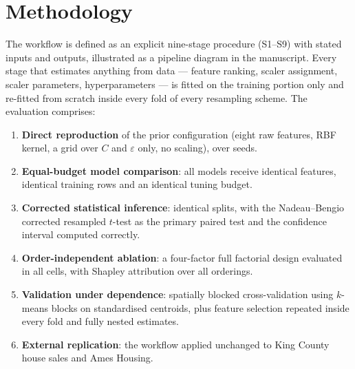 \documentclass[11pt,a4paper]{article}
\begin{document}
\section{Methodology}
The workflow is defined as an explicit nine-stage procedure (S1--S9) with stated inputs and
outputs, illustrated as a pipeline diagram in the manuscript. Every stage that estimates
anything from data --- feature ranking, scaler assignment, scaler parameters, hyperparameters
--- is fitted on the training portion only and re-fitted from scratch inside every fold of
every resampling scheme. The evaluation comprises:

\begin{enumerate}[leftmargin=*,itemsep=2pt]
\item \textbf{Direct reproduction} of the prior configuration (eight raw features, RBF kernel,
      a grid over $C$ and $\varepsilon$ only, no scaling), over \RepSeeds{} seeds.
\item \textbf{Equal-budget model comparison}: all \NModels{} models receive identical
      features, identical training rows and an identical tuning budget.
\item \textbf{Corrected statistical inference}: \StatSplits{} identical splits, with the
      Nadeau--Bengio corrected resampled $t$-test as the primary paired test and the
      confidence interval computed correctly.
\item \textbf{Order-independent ablation}: a four-factor full factorial design evaluated in
      all \AblNcells{} cells, with Shapley attribution over all \AblNorders{} orderings.
\item \textbf{Validation under dependence}: spatially blocked cross-validation using
      $k$-means blocks on standardised centroids, plus feature selection repeated inside every
      fold and fully nested estimates.
\item \textbf{External replication}: the workflow applied unchanged to King County house
      sales and Ames Housing.
\end{enumerate}
\end{document}
